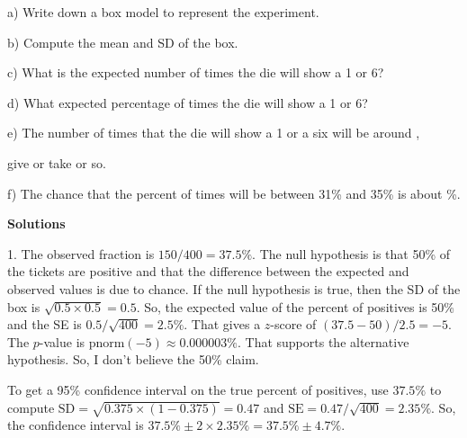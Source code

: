 \documentclass[10pt]{article}
\begin{document}
\hspace{10pt} a) Write down a box model to represent the experiment.
\vspace{.5in}

\hspace{10pt} b) Compute the mean and SD of the box.
\vspace{1in}

\hspace{10pt} c) What is the expected number of times the die will show a 1 or 6?
\vspace{1in}

\hspace{10pt} d) What expected percentage of times the die will show a 1 or 6?
\vspace{1in}

\hspace{10pt} e) The number of times that the die will show a 1 or a six 
will be around \underline{\hspace{1in}},\vspace{10pt}

\hspace{10pt}\hphantom{e) }give or take \underline{\hspace{1in}} or so.  %
\vspace{1.5in}

\hspace{10pt} f) The chance that the percent of times will be between 31\% and 35\% is about
\underline{\hspace{1in}} \%.  
\vfill
\eject

\begin{center}
\textbf{\large Solutions}
\end{center}

1. The observed fraction is $150/400=37.5\%$.  
The null hypothesis is that 50\% of the tickets are positive and that the difference between
the expected and observed values is due to chance.  If the null hypothesis is true, then
the SD of the box is $\sqrt{0.5\times 0.5}=0.5$.  So, the expected value of the percent of
positives is 50\% and the SE is $0.5/\sqrt{400}=2.5\%$.  That gives a $z$-score of 
$(37.5-50)/2.5=-5$.  The $p$-value is $\mbox{pnorm}(-5)\approx 0.000003\%$.  That supports the 
alternative hypothesis.  So, I don't believe the 50\% claim. 

To get a 95\% confidence interval on the true percent of positives, use $37.5\%$ to compute 
$\mbox{SD}=\sqrt{0.375\times (1-0.375)}=0.47$ and $\mbox{SE}=0.47/\sqrt{400}=2.35\%$.  So,
the confidence interval is $37.5\% \pm 2\times 2.35\% = 37.5\% \pm 4.7\%$.
\medskip
\end{document}
